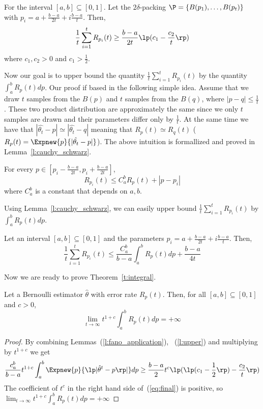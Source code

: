 \begin{lemma}\label{l:fano_application}
For the interval $[a,b] \subseteq [0,1]$. Let the $2\delta$-packing $\P=\{B(p_1),\ldots,B(p_t)\}$ with $p_i = a+\frac{b-a}{2t} + i \frac{b-a}{t}$. Then,
\[\frac{1}{t} \sum_{i=1}^t R_{p_i}(t) \geq \frac{b-a}{2t} \lp(c_1 - \frac{c_2}{t}\rp)\]
where $c_1, c_2 >0$ and $c_1 > \frac{1}{2}$.
\end{lemma}

\noindent Now our goal is to upper bound the quantity $\frac{1}{t} \sum_{i=1}^{t} R_{p_i}(t)$ by the quantity $\int_{a}^b R_p(t)dp$.
Our proof if based in the following simple idea. Assume that we draw $t$ samples from the $B(p)$ and $t$ samples
from the $B(q)$, where $|p-q|\leq \frac{1}{t}$. These two product distribution are approximately the same since 
we only $t$ samples are drawn and their parameters differ only by $\frac{1}{t}$. At the same time we have that 
$|\hat{\theta_t}-p| \simeq |\hat{\theta_t}-q|$ meaning that $R_p(t)\simeq R_q(t)$ ($R_p(t)=\Expnew{p}{|\hat{\theta_t}-p|}$).
The above intuition is formallized and proved in Lemma~\ref{l:cauchy_schwarz}.

\begin{lemma}\label{l:cauchy_schwarz}
For every $p\in [p_i -\frac{b-a}{2t},p_i + \frac{b-a}{2t}]$,
\[R_{p_i}(t) \leq C_a^b R_{p}(t) +  |p-p_i|\]
where $C_a^b$ is a constant that depends on $a,b$.
 \end{lemma}
\noindent Using Lemma~\ref{l:cauchy_schwarz}, we can easily upper bound $\frac{1}{t} \sum_{i=1}^{t} R_{p_i}(t)$ by $\int_{a}^b R_p(t)dp$.
 
\begin{lemma}\label{l:upper}
Let an interval $[a,b] \subseteq [0,1]$ and the parameters $p_i = a+\frac{b-a}{2t} + i \frac{b-a}{t}$. Then,
\[ \frac{1}{t} \sum_{i=1}^{t} R_{p_i}(t) \leq \frac{C_a^b}{b-a} \int_a^b R_p(t) dp + \frac{b-a}{4t}\]
\end{lemma}
\noindent Now we are ready to prove Theorem~\ref{t:integral}.

\begin{theorem}
Let a Bernoulli estimator $\hat{\theta}$ with error rate $R_p(t)$. Then, for all $[a,b] \subseteq [0,1]$ and $c>0$,
\[ \lim_{t \to \infty}t^{1+c} \int_{a}^{b}R_p(t)dp = +\infty\]
\end{theorem} 
\begin{proof}
By combining Lemmas~(\ref{l:fano_application}), ~(\ref{l:upper}) and multiplying by $t^{1+c}$ we get
\begin{equation*}\label{eq:final}
\frac{c_a^b}{b-a}t^{1+c} \int_a^b \Expnew{p}{\lp|\hat{\theta}^t-p\rp|}dp \geq \frac{b-a}{2}t^c\lp(\lp(c_1 - \frac{1}{2}\rp)- \frac{c_2}{t}\rp)
\end{equation*}
The coefficient of $t^c$ in the right hand side of~(\ref{eq:final}) is positive, so $\lim_{t\to\infty} t^{1+c}\int_{a}^b R_p(t)dp = +\infty$
\end{proof}
